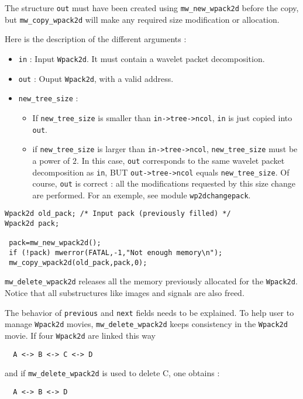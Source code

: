 The structure \verb+out+ must have been created using \verb+mw_new_wpack2d+ before
the copy, but \verb+mw_copy_wpack2d+ will make any required size modification or allocation.

Here is the description of the different arguments :
\begin{itemize}
\item \verb+in+ : Input \verb+Wpack2d+. It must contain a wavelet packet decomposition.  
\item \verb+out+ : Ouput \verb+Wpack2d+, with a valid address.
\item \verb+new_tree_size+ : 
\begin{itemize}
\item If \verb+new_tree_size+ is smaller than \verb+in->tree->ncol+, \verb+in+ is
  just copied into \verb+out+.
\item if \verb+new_tree_size+ is larger than \verb+in->tree->ncol+, \verb+new_tree_size+
  must be a power of $2$. In this case, \verb+out+ corresponds to
  the same wavelet packet decomposition as \verb+in+, BUT \verb+out->tree->ncol+
  equals \verb+new_tree_size+. Of course, \verb+out+ is correct : all the modifications
  requested by this size change are performed. For an exemple, see 
  module \verb+wp2dchangepack+.
\end{itemize}
\end{itemize}

\Next
\Example
\begin{verbatim}
Wpack2d old_pack; /* Input pack (previously filled) */
Wpack2d pack;

 pack=mw_new_wpack2d();
 if (!pack) mwerror(FATAL,-1,"Not enough memory\n");
 mw_copy_wpack2d(old_pack,pack,0);
\end{verbatim}


\newpage %

\Description
\verb+mw_delete_wpack2d+ releases all the memory previously
allocated for the \verb+Wpack2d+. Notice that all substructures
like images and signals are also freed.

The behavior of \verb+previous+ and \verb+next+ fields needs to be
explained. To help user to manage \verb+Wpack2d+ movies,
\verb+mw_delete_wpack2d+ keeps consistency in the \verb+Wpack2d+ movie.
If four \verb+Wpack2d+ are linked this way 
\begin{verbatim}
  A <-> B <-> C <-> D
\end{verbatim}
and if \verb+mw_delete_wpack2d+ is used to delete C, one obtains :  
\begin{verbatim}
  A <-> B <-> D
\end{verbatim}

